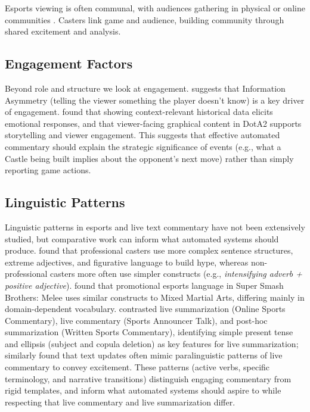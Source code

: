 Esports viewing is often communal, with audiences gathering in physical or online communities \cite{sjoblom2017}. Casters link game and audience, building community through shared excitement and analysis.

\subsection{Engagement Factors}
Beyond role and structure we look at engagement. \citet{cheung2011starcraft} suggests that Information Asymmetry (telling the viewer something the player doesn't know) is a key driver of engagement. \citet{block2018} found that showing context-relevant historical data elicits emotional responses, and that viewer-facing graphical content in DotA2 supports storytelling and viewer engagement. This suggests that effective automated commentary should explain the strategic significance of events (e.g., what a Castle being built implies about the opponent's next move) rather than simply reporting game actions.

\subsection{Linguistic Patterns}
Linguistic patterns in esports and live text commentary have not been extensively studied, but comparative work can inform what automated systems should produce. \citet{byro2017} found that professional casters use more complex sentence structures, extreme adjectives, and figurative language to build hype, whereas non-professional casters more often use simpler constructs (e.g., \textit{intensifying adverb + positive adjective}). \citet{gustin2020} found that promotional esports language in Super Smash Brothers: Melee uses similar constructs to Mixed Martial Arts, differing mainly in domain-dependent vocabulary. \citet{lewandowski2012} contrasted live summarization (Online Sports Commentary), live commentary (Sports Announcer Talk), and post-hoc summarization (Written Sports Commentary), identifying simple present tense and ellipsis (subject and copula deletion) as key features for live summarization; \citet{pavzanin2022} similarly found that text updates often mimic paralinguistic patterns of live commentary to convey excitement. These patterns (active verbs, specific terminology, and narrative transitions) distinguish engaging commentary from rigid templates, and inform what automated systems should aspire to while respecting that live commentary and live summarization differ.

